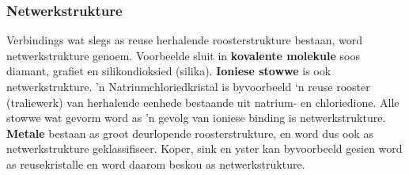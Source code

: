 \subsubsection*{Netwerkstrukture}
Verbindings wat slegs as reuse herhalende roosterstrukture bestaan, word netwerkstrukture genoem. Voorbeelde sluit in \textbf{kovalente molekule} soos diamant, grafiet en silikondioksied (silika). \textbf{Ioniese stowwe} is ook netwerkstrukture. 'n Natriumchloriedkristal is byvoorbeeld ‘n reuse rooster (traliewerk) van herhalende eenhede bestaande uit natrium- en chloriedione. Alle stowwe wat gevorm word as 'n gevolg van ioniese binding is netwerkstrukture. \textbf{Metale} bestaan as groot deurlopende roosterstrukture, en word dus ook as netwerkstrukture geklassifiseer. Koper, sink en yster kan byvoorbeeld gesien word as reusekristalle en word daarom beskou as netwerkstrukture.
